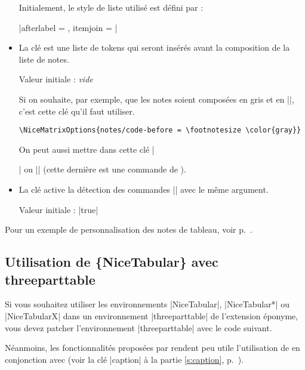 \documentclass[dvipsnames]{article}%
\begin{document}
\begin{itemize}[itemsep=\medskipamount]
Initialement, le style de liste utilisé est défini par :\quad 

|afterlabel = \nobreak, itemjoin = \quad|


\item La clé  est une liste de tokens qui seront
insérés avant la composition de la liste de notes.

Valeur initiale : \textsl{vide}

Si on souhaite, par exemple, que les notes soient composées en gris et en
|\footnotesize|, c'est cette clé qu'il faut utiliser.
\begin{Verbatim}
\NiceMatrixOptions{notes/code-before = \footnotesize \color{gray}}
\end{Verbatim}
On peut aussi mettre dans cette clé |\raggedright| ou |\RaggedRight| (cette
dernière est une commande de ).

\item La clé  active la détection des
commandes |\tabularnote| avec le même argument.

Valeur initiale : |true|
\end{itemize}



\medskip
Pour un exemple de personnalisation des notes de tableau, voir p.~\pageref{ex:notes}.


\subsection{Utilisation de \{NiceTabular\} avec threeparttable}


Si vous souhaitez utiliser les environnements |{NiceTabular}|, |{NiceTabular*}|
ou |{NiceTabularX}| dans un environnement |{threeparttable}| de l'extension
éponyme, vous devez patcher l'environnement |{threeparttable}| avec le code
suivant.

\begin{Code}
\makeatletter
{}
  {}
\makeatother
\end{Code}

Néanmoins, les fonctionnalités proposées par  rendent peu utile
l'utilisation de  en conjonction avec  (voir
la clé |caption| à la partie \ref{s:caption}, p.~\pageref{s:caption}).
\end{document}
